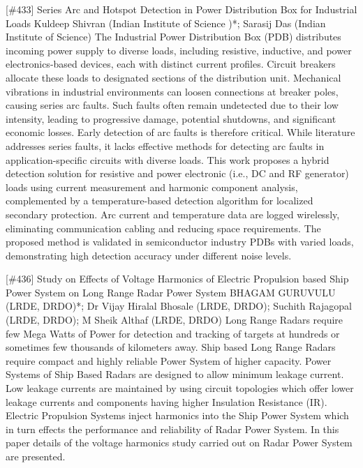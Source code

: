 {} \begin{abstract_online} {[\#433] Series Arc and Hotspot Detection in Power Distribution Box for Industrial Loads} {} {Kuldeep  Shivran (Indian Institute of Science )*; Sarasij Das (Indian Institute of Science)} {} The Industrial Power Distribution Box (PDB) distributes incoming power supply to diverse loads, including resistive, inductive, and power electronics-based devices, each with distinct current profiles. Circuit breakers allocate these loads to designated sections of the distribution unit. Mechanical vibrations in industrial environments can loosen connections at breaker poles, causing series arc faults. Such faults often remain undetected due to their low intensity, leading to progressive damage, potential shutdowns, and significant economic losses. Early detection of arc faults is therefore critical. While literature addresses series faults, it lacks effective methods for detecting arc faults in application-specific circuits with diverse loads. This work proposes a hybrid detection solution for resistive and power electronic (i.e., DC and RF generator) loads using current measurement and harmonic component analysis, complemented by a temperature-based detection algorithm for localized secondary protection. Arc current and temperature data are logged wirelessly, eliminating communication cabling and reducing space requirements. The proposed method is validated in semiconductor industry PDBs with varied loads, demonstrating high detection accuracy under different noise levels. \end{abstract_online} 
{} \begin{abstract_online} {[\#436] Study on Effects of Voltage Harmonics of Electric Propulsion based Ship Power System on Long Range Radar Power System} {} {BHAGAM GURUVULU (LRDE, DRDO)*; Dr Vijay Hiralal Bhosale  (LRDE, DRDO); Suchith Rajagopal  (LRDE, DRDO); M Sheik Althaf (LRDE, DRDO)} {} Long Range Radars require few Mega Watts of Power for detection and tracking of targets at hundreds or sometimes few thousands of kilometers away. Ship based Long Range Radars require compact and highly reliable Power System of higher capacity. Power Systems of Ship Based Radars are designed to allow minimum leakage current. Low leakage currents are maintained by using circuit topologies which offer lower leakage currents and components having higher Insulation Resistance (IR). Electric Propulsion Systems inject harmonics into the Ship Power System which in turn effects the performance and reliability of Radar Power System. In this paper details of the voltage harmonics study carried out on Radar Power System are presented. \end{abstract_online} 
